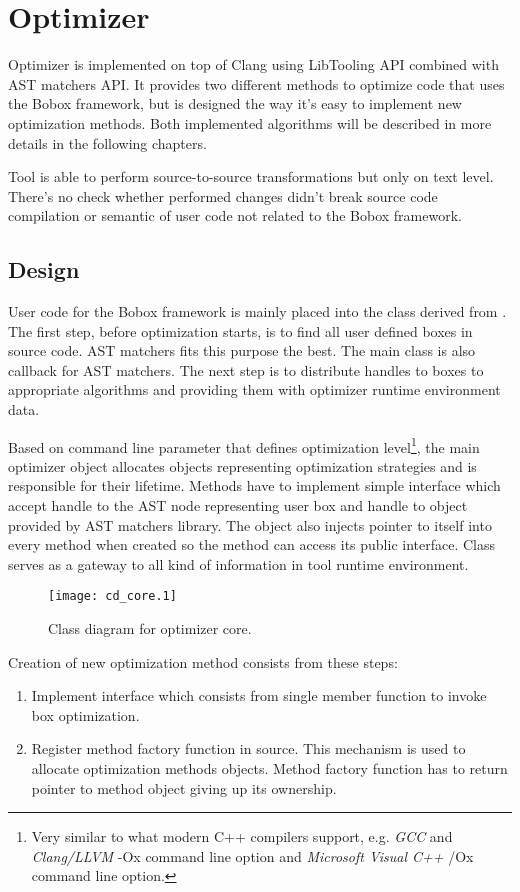 \chapter{Optimizer}
Optimizer is implemented on top of Clang using LibTooling API combined with AST matchers API. It provides two different methods to optimize code that uses the Bobox framework, but is designed the way it's easy to implement new optimization methods. Both implemented algorithms will be described in more details in the following chapters.

Tool is able to perform source-to-source transformations but only on text level. There's no check whether performed changes didn't break source code compilation or semantic of user code not related to the Bobox framework.

\section{Design}
User code for the Bobox framework is mainly placed into the class derived from . The first step, before optimization starts, is to find all user defined boxes in source code. AST matchers fits this purpose the best. The main  class is also callback for AST matchers. The next step is to distribute handles to boxes to appropriate algorithms and providing them with optimizer runtime environment data.

Based on command line parameter that defines optimization level\footnote{Very similar to what modern C++ compilers support, e.g. \emph{GCC} and \emph{Clang/LLVM} -Ox command line option and \emph{Microsoft Visual C++} /Ox command line option.}, the main optimizer object allocates objects representing optimization strategies and is responsible for their lifetime. Methods have to implement simple interface which accept handle to the AST node representing user box and handle to  object provided by AST matchers library. The  object also injects pointer to itself into every method when created so the method can access its public interface. Class serves as a gateway to all kind of information in tool runtime environment.

\begin{figure}[h!]
	\caption{Class diagram for optimizer core.}
	\centering
		\texttt{[image: cd\_core.1]}
\end{figure}

Creation of new optimization method consists from these steps:
\begin{enumerate}
\item Implement  interface which consists from single member function to invoke box optimization.
\item Register method factory function in  source. This mechanism is used to allocate optimization methods objects. Method factory function has to return pointer to method object giving up its ownership.
\end{enumerate}

